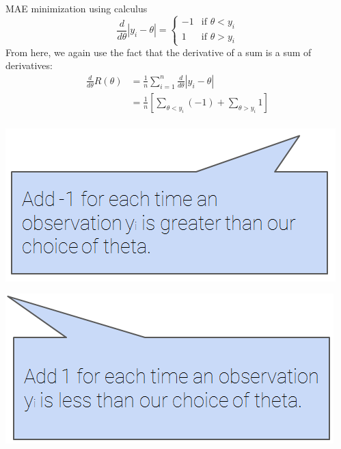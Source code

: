 \documentclass[aspectratio=169]{../latex_main/tntbeamer}  %
\begin{document}
	\begin{frame}{MAE minimization using calculus}
	    \begin{equation*}
            \frac{d}{d\theta}|y_i - \theta| = \left\{\begin{array}{cc}
               -1 & \text{if }\theta < y_i\\
              1  & \text{if } \theta > y_i
            \end{array}\right.
        \end{equation*}
        From here, we again use the fact that the derivative of a sum is a sum of derivatives:
        \begin{align*}
            \frac{d}{d\theta}R(\theta) &= \frac{1}{n}\sum\limits_{i=1}^n\frac{d}{d\theta}|y_i - \theta|\\
            &= \frac{1}{n}[\sum\limits_{\theta < y_i}(-1) + \sum\limits_{\theta > y_i} 1]
        \end{align*}\\
        
        \vspace{-.3cm}
        \hspace{2.5cm} \includegraphics[scale=.4]{Bild39}\\
        \vspace{.3cm}
        
        
        \vspace{-2.8cm}
        \hspace{9.7cm} \includegraphics[scale=.4]{Bild40}\\
        \vspace{2.8cm}
	\end{frame}
	
\end{document}
